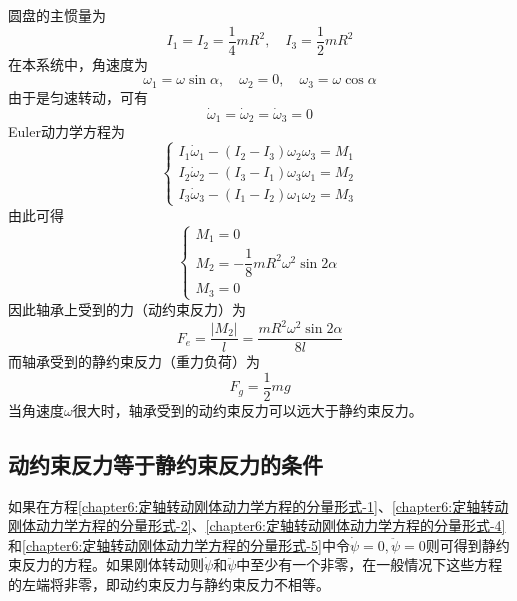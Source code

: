 \begin{solution}
圆盘的主惯量为
\begin{equation*}
	I_1 = I_2 = \frac14 mR^2,\quad I_3 = \frac12 mR^2
\end{equation*}
在本系统中，角速度为
\begin{equation*}
	\omega_1 = \omega \sin \alpha,\quad \omega_2 = 0,\quad \omega_3 = \omega \cos \alpha
\end{equation*}
由于是匀速转动，可有
\begin{equation*}
	\dot{\omega}_1 = \dot{\omega}_2 = \dot{\omega}_3 = 0
\end{equation*}
Euler动力学方程为
\begin{equation*}
	\begin{cases}
		I_1 \dot{\omega}_1 - (I_2-I_3)\omega_2 \omega_3 = M_1 \\
		I_2 \dot{\omega}_2 - (I_3-I_1)\omega_3 \omega_1 = M_2 \\
		I_3 \dot{\omega}_3 - (I_1-I_2)\omega_1 \omega_2 = M_3
	\end{cases}
\end{equation*}
由此可得
\begin{equation*}
	\begin{cases}
		M_1 = 0 \\
		M_2 = -\dfrac18 mR^2 \omega^2 \sin 2\alpha \\ 
		M_3 = 0
	\end{cases}
\end{equation*}
因此轴承上受到的力（动约束反力）为
\begin{equation*}
	F_e = \frac{|M_2|}{l} = \frac{mR^2 \omega^2 \sin 2\alpha}{8l}
\end{equation*}
而轴承受到的静约束反力（重力负荷）为
\begin{equation*}
	F_g = \frac12 mg
\end{equation*}
当角速度$\omega$很大时，轴承受到的动约束反力可以远大于静约束反力。
\end{solution}

\subsection{动约束反力等于静约束反力的条件}

如果在方程\eqref{chapter6:定轴转动刚体动力学方程的分量形式-1}、\eqref{chapter6:定轴转动刚体动力学方程的分量形式-2}、\eqref{chapter6:定轴转动刚体动力学方程的分量形式-4}和\eqref{chapter6:定轴转动刚体动力学方程的分量形式-5}中令$\dot{\psi}=0,\ddot{\psi}=0$则可得到静约束反力的方程。如果刚体转动则$\dot{\psi}$和$\ddot{\psi}$中至少有一个非零，在一般情况下这些方程的左端将非零，即动约束反力与静约束反力不相等。


